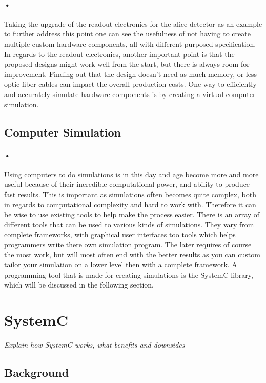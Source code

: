 \documentclass[a4paper]{report}
\begin{document}
{\paragraph{•}
Taking the upgrade of the readout electronics for the \gls{alice} detector as an example to further address this point one can see the usefulness of not having to create multiple custom hardware components, all with different purposed specification.
In regards to the readout electronics, another important point is that the proposed designs might work well from the start, but there is always room for improvement.
Finding out that the design doesn't need as much memory, or less optic fiber cables can impact the overall production costs.
One way to efficiently and accurately simulate hardware components is by creating a virtual computer simulation.

\subsection{Computer Simulation}
\paragraph{•}
Using computers to do simulations is in this day and age become more and more useful because of their incredible computational power, and ability to produce fast results.
This is important as simulations often becomes quite complex, both in regards to computational complexity and hard to work with.
Therefore it can be wise to use existing tools to help make the process easier.
There is an array of different tools that can be used to various kinds of simulations.
They vary from complete frameworks, with graphical user interfaces too tools which helps programmers write there own simulation program.
The later requires of course the most work, but will most often end with the better results as you can custom tailor your simulation on a lower level then with a complete framework.
A programming tool that is made for creating simulations is the SystemC library, which will be discussed in the following section.

\section{SystemC}
\textit{Explain how SystemC works, what benefits and downsides}

\subsection{Background}
}
\end{document}

